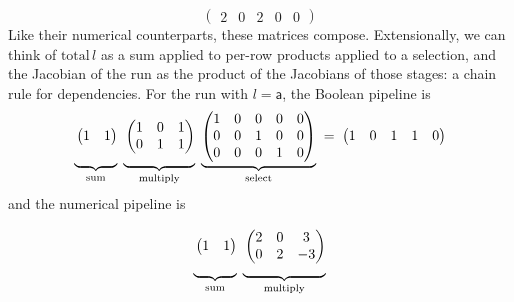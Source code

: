 \begin{example}
\begin{displaymath}
    \begin{pmatrix} 2 & 0 & 2 & 0 & 0 \end{pmatrix}
  \end{displaymath}
  Like their numerical counterparts, these matrices compose. Extensionally, we can think of
  $\mathrm{total}\,l$ as a sum applied to per-row products applied to a selection, and the Jacobian of the run
  as the product of the Jacobians of those stages: a chain rule for dependencies. For the run with $l =
  \mathsf{a}$, the Boolean pipeline is
  \begin{displaymath}
    \underbrace{\vphantom{\begin{pmatrix} 0 \\ 0 \\ 0 \end{pmatrix}}\begin{pmatrix} 1 & 1 \end{pmatrix}}_{\text{sum}}
    \;
    \underbrace{\vphantom{\begin{pmatrix} 0 \\ 0 \\ 0 \end{pmatrix}}\begin{pmatrix} 1 & 0 & 1 \\ 0 & 1 & 1 \end{pmatrix}}_{\text{multiply}}
    \;
    \underbrace{\begin{pmatrix} 1 & 0 & 0 & 0 & 0 \\ 0 & 0 & 1 & 0 & 0 \\ 0 & 0 & 0 & 1 & 0 \end{pmatrix}}_{\text{select}}
    \;=\;
    \begin{pmatrix} 1 & 0 & 1 & 1 & 0 \end{pmatrix}
  \end{displaymath}
  and the numerical pipeline is
  \begin{displaymath}
    \underbrace{\vphantom{\begin{pmatrix} 0 \\ 0 \\ 0 \end{pmatrix}}\begin{pmatrix} 1 & 1 \end{pmatrix}}_{\text{sum}}
    \;
    \underbrace{\vphantom{\begin{pmatrix} 0 \\ 0 \\ 0 \end{pmatrix}}\begin{pmatrix} 2 & 0 & 3 \\ 0 & 2 & -3 \end{pmatrix}}_{\text{multiply}}

\end{displaymath}
\end{example}
